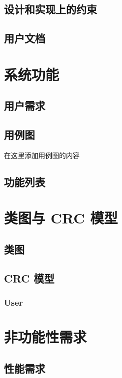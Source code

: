 \documentclass[12pt]{ctexart} %
\begin{document}
\subsection{设计和实现上的约束}


\subsection{用户文档}


\section{系统功能}
\subsection{用户需求}

\subsection{用例图}
在这里添加用例图的内容

\subsection{功能列表}

\section{类图与 CRC 模型}
\subsection{类图}

\subsection{CRC 模型}
\subsubsection{User}


\section{非功能性需求}
\subsection{性能需求}
\end{document}
